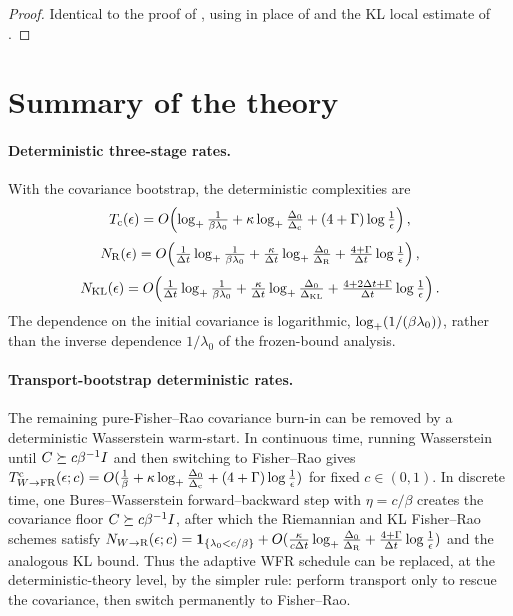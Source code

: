 \begin{proof}
Identical to the proof of , using 
in place of  and the KL local estimate of .
\end{proof}

\section{Summary of the theory}
\label{sec:theory-summary}

\paragraph{Deterministic three-stage rates.}
With the covariance bootstrap, the deterministic complexities are
\[
    T_{\mathrm c}(\epsilon)
    =
    O\!\left(
        \log_+\tfrac1{\beta\lambda_0}
        +\kappa\log_+\tfrac{\Delta_0}{\Delta_{\mathrm c}}
        +(4+\Gamma)\log\tfrac1\epsilon
    \right),
\]
\[
    N_{\mathrm{R}}(\epsilon)
    =
    O\!\left(
        \tfrac1{\Delta t}\log_+\tfrac1{\beta\lambda_0}
        +\tfrac\kappa{\Delta t}\log_+\tfrac{\Delta_0}{\Delta_{\mathrm{R}}}
        +\tfrac{4+\Gamma}{\Delta t}\log\tfrac1\epsilon
    \right),
\]
\[
    N_{\mathrm{KL}}(\epsilon)
    =
    O\!\left(
        \tfrac1{\Delta t}\log_+\tfrac1{\beta\lambda_0}
        +\tfrac\kappa{\Delta t}\log_+\tfrac{\Delta_0}{\Delta_{\mathrm{KL}}}
        +\tfrac{4+2\Delta t+\Gamma}{\Delta t}\log\tfrac1\epsilon
    \right).
\]
The dependence on the initial covariance is logarithmic, $\log_+(1/(\beta\lambda_0))$,
rather than the inverse dependence $1/\lambda_0$ of the frozen-bound analysis.

\paragraph{Transport-bootstrap deterministic rates.}
The remaining pure-Fisher--Rao covariance burn-in can be removed by a deterministic
Wasserstein warm-start. In continuous time, running Wasserstein until
$C\succeq c\beta^{-1}I$ and then switching to Fisher--Rao gives
$T_{W\to\mathrm{FR}}^{\mathrm c}(\epsilon;c)=O(\tfrac1\beta+\kappa\log_+\tfrac{\Delta_0}{\Delta_{\mathrm c}}+(4+\Gamma)\log\tfrac1\epsilon)$
for fixed $c\in(0,1)$. In discrete time, one Bures--Wasserstein forward--backward step with
$\eta=c/\beta$ creates the covariance floor $C\succeq c\beta^{-1}I$, after which the
Riemannian and KL Fisher--Rao schemes satisfy
$N_{W\to\mathrm{R}}(\epsilon;c)=\mathbf 1_{\{\lambda_0<c/\beta\}}+O(\tfrac\kappa{c\Delta t}\log_+\tfrac{\Delta_0}{\Delta_{\mathrm{R}}}+\tfrac{4+\Gamma}{\Delta t}\log\tfrac1\epsilon)$
and the analogous KL bound. Thus the adaptive WFR schedule can be replaced, at the
deterministic-theory level, by the simpler rule: perform transport only to rescue the
covariance, then switch permanently to Fisher--Rao.

